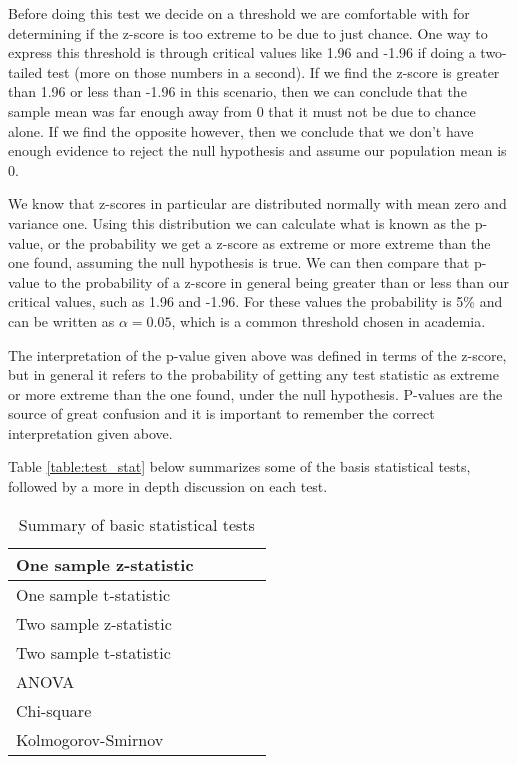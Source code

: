 Before doing this test we decide on a threshold we are comfortable with for determining if the z-score is too extreme to be due to just chance. One way to express this threshold is through critical values like 1.96 and -1.96 if doing a two-tailed test (more on those numbers in a second). If we find the z-score is greater than 1.96 or less than -1.96 in this scenario, then we can conclude that the sample mean was far enough away from 0 that it must not be due to chance alone. If we find the opposite however, then we conclude that we don't have enough evidence to reject the null hypothesis and assume our population mean is 0. 

We know that z-scores in particular are distributed normally with mean zero and variance one. Using this distribution we can calculate what is known as the p-value, or the probability we get a z-score as extreme or more extreme than the one found, assuming the null hypothesis is true. We can then compare that p-value to the probability of a z-score in general being greater than or less than our critical values, such as 1.96 and -1.96. For these values the probability is 5\% and can be written as $\alpha=0.05$, which is a common threshold chosen in academia. 

The interpretation of the p-value given above was defined in terms of the z-score, but in general it refers to the probability of getting any test statistic as extreme or more extreme than the one found, under the null hypothesis. P-values are the source of great confusion and it is important to remember the correct interpretation given above.

Table \ref{table:test_stat} below summarizes some of the basis statistical tests, followed by a more in depth discussion on each test.\newline

\begin{table}[] \label{table:test_stat}
\begin{tabular}{|l|l|l|l|l|}
\hline
One sample z-statistic &  &  &  &  \\ \hline
One sample t-statistic &  &  &  &  \\ \hline
Two sample z-statistic                      &  &  &  &  \\ \hline
Two sample t-statistic                      &  &  &  &  \\ \hline
ANOVA                      &  &  &  &  \\ \hline
Chi-square                      &  &  &  &  \\ \hline
Kolmogorov-Smirnov                     &  &  &  &  \\ \hline
\end{tabular}
\caption{Summary of basic statistical tests}\label{table:somename}
\end{table}



